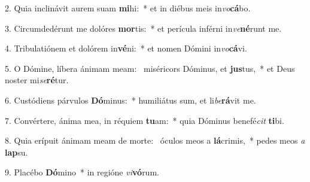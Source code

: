 2. Quia inclinávit aurem suam \textbf{mi}hi:~*  et in diébus meis in\textit{vo}\textbf{cá}bo.\

3. Circumdedérunt me dolóres \textbf{mor}tis:~*  et perícula inférni in\textit{ve}\textbf{né}runt me.\

4. Tribulatiónem et dolórem in\textbf{vé}ni:~*  et nomen Dómini in\textit{vo}\textbf{cá}vi.\

5. O Dómine, líbera ánimam meam: \dag\  miséricors Dóminus, et \textbf{jus}tus,~*  et Deus noster mi\textit{se}\textbf{ré}tur.\

6. Custódiens párvulos \textbf{Dó}minus:~*  humiliátus sum, et li\textit{be}\textbf{rá}vit me.\

7. Convértere, ánima mea, in réquiem \textbf{tu}am:~*  quia Dóminus benefé\textit{cit} \textbf{ti}bi.\

8. Quia erípuit ánimam meam de morte: \dag\  óculos meos a \textbf{lá}crimis,~*  pedes meos \textit{a} \textbf{lap}su.\

9. Placébo \textbf{Dó}mino~*  in regióne \textit{vi}\textbf{vó}rum.\

